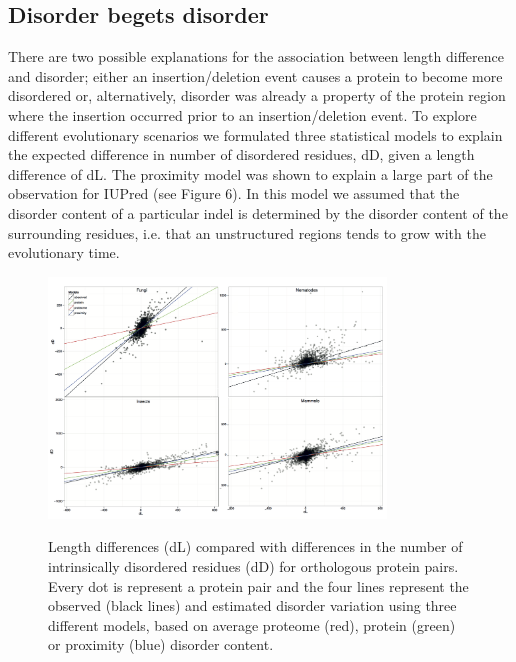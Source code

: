 \documentclass[11pt, a4paper,oneside]{report}
\begin{document}
\subsection{Disorder begets disorder}
There are two possible explanations for the association between length difference and disorder; either an insertion/deletion event causes a protein to become more disordered or, alternatively, disorder was already a property of the protein region where the insertion occurred prior to an insertion/deletion event. To explore different evolutionary scenarios we formulated three statistical models to explain the expected difference in number of disordered residues, dD, given a length difference of dL. The proximity model was shown to explain a large part of the observation for IUPred (see Figure 6). In this model we assumed that the disorder content of a particular indel is determined by the disorder content of the surrounding residues, i.e. that an unstructured regions tends to grow with the evolutionary time. 
\begin{figure}[t]
\begin{center}
\label{img:populations}
\includegraphics[width=0.8\textwidth]{figures/lenvar.png}
\end{center}
\caption{Length differences (dL) compared with differences in the
  number of intrinsically disordered residues (dD) for orthologous
  protein pairs. Every dot is represent a protein pair and the four
  lines represent the observed (black lines) and estimated disorder
  variation using three different models, based on average proteome
  (red), protein (green) or proximity (blue) disorder content.} 
\end{figure}
\end{document}
